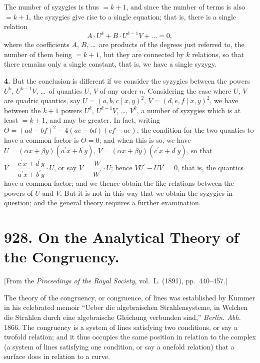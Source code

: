\documentclass[11pt,a4paper]{book}
\begin{document}
The number of syzygies is thus $= k + 1$, and since the number of terms is
also $= k + 1$, the syzygies give rise to a single equation; that is, there is a single
relation
\[
A \cdot U^k + B \cdot U^{k-1}V + \ldots = 0,
\]
where the coefficients $A$, $B$, \ldots\ are products of the degrees just referred to, the
number of them being $= k + 1$, but they are connected by $k$ relations, so that there
remains only a single constant, that is, we have a single syzygy.

\textbf{4.} But the conclusion is different if we consider the syzygies between the
powers $U^k$, $U^{k-1}V$, \ldots\ of quantics $U$, $V$ of any order $n$. Considering the case
where $U$, $V$ are quadric quantics, say $U = (a, b, c \mid x, y)^2$, $V = (d, e, f \mid x, y)^2$,
we have between the $k + 1$ powers $U^k$, $U^{k-1}V$, \ldots, $V^k$, a number of syzygies which
is at least $= k + 1$, and may be greater. In fact, writing $\Theta = (ad - bf)^2 - 4(ae - bd)(cf - ae)$,
the condition for the two quantics to have a common factor is $\Theta = 0$; and when
this is so, we have $U = (\alpha x + \beta y)(a^\prime x + b^\prime y)$, $V = (\alpha x + \beta y)(c^\prime x + d^\prime y)$,
so that $V = \dfrac{c^\prime x + d^\prime y}{a^\prime x + b^\prime y} \cdot U$, or say $V = \dfrac{W}{W^\prime} \cdot U$; hence $VU^\prime - UV^\prime = 0$,
that is, the quantics have a common factor; and we thence obtain the like relations
between the powers of $U$ and $V$. But it is not in this way that we obtain the
syzygies in question; and the general theory requires a further examination.



\newpage
\section*{928. On the Analytical Theory of the Congruency.}

[From the \textit{Proceedings of the Royal Society}, vol.~L. (1891), pp.~440--457.]

\bigskip

The theory of the congruency, or congruence, of lines was established by
Kummer in his celebrated memoir ``Ueber die algebraischen Strahlensysteme, in
Welchen die Strahlen durch eine algebraische Gleichung verbunden sind,'' \textit{Berlin.
Abh.} 1866. The congruency is a system of lines satisfying two conditions, or say
a twofold relation; and it thus occupies the same position in relation to the complex
(a system of lines satisfying one condition, or say a onefold relation) that a surface
does in relation to a curve.
\end{document}
